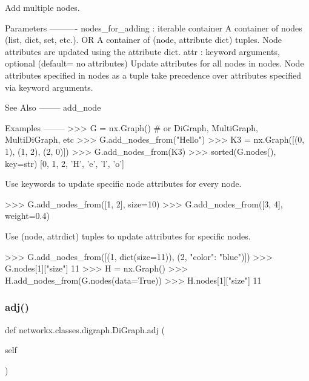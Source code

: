 \begin{DoxyVerb}Add multiple nodes.

Parameters
----------
nodes_for_adding : iterable container
    A container of nodes (list, dict, set, etc.).
    OR
    A container of (node, attribute dict) tuples.
    Node attributes are updated using the attribute dict.
attr : keyword arguments, optional (default= no attributes)
    Update attributes for all nodes in nodes.
    Node attributes specified in nodes as a tuple take
    precedence over attributes specified via keyword arguments.

See Also
--------
add_node

Examples
--------
>>> G = nx.Graph()  # or DiGraph, MultiGraph, MultiDiGraph, etc
>>> G.add_nodes_from("Hello")
>>> K3 = nx.Graph([(0, 1), (1, 2), (2, 0)])
>>> G.add_nodes_from(K3)
>>> sorted(G.nodes(), key=str)
[0, 1, 2, 'H', 'e', 'l', 'o']

Use keywords to update specific node attributes for every node.

>>> G.add_nodes_from([1, 2], size=10)
>>> G.add_nodes_from([3, 4], weight=0.4)

Use (node, attrdict) tuples to update attributes for specific nodes.

>>> G.add_nodes_from([(1, dict(size=11)), (2, {"color": "blue"})])
>>> G.nodes[1]["size"]
11
>>> H = nx.Graph()
>>> H.add_nodes_from(G.nodes(data=True))
>>> H.nodes[1]["size"]
11\end{DoxyVerb}
 \mbox{\label{classnetworkx_1_1classes_1_1digraph_1_1DiGraph_a8b30e5c48fa7b7a0ef8feb255e93456f}} 
\subsubsection{\texorpdfstring{adj()}{adj()}}
{\footnotesize\ttfamily def networkx.\+classes.\+digraph.\+Di\+Graph.\+adj (\begin{DoxyParamCaption}\item[{}]{self }\end{DoxyParamCaption})}

